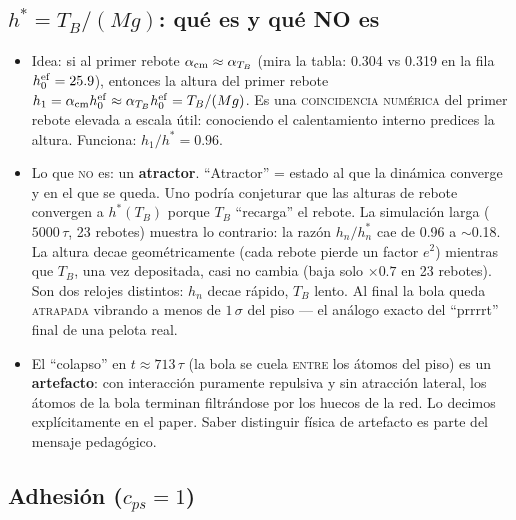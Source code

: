 \documentclass[11pt,a4paper]{article}
\begin{document}
\subsection{\texorpdfstring{$h^*=T_B/(Mg)$}{h*=TB/(Mg)}: qué es y qué NO es}

\begin{itemize}[leftmargin=1.4em]
    \item Idea: si al primer rebote $\alpha_{\rm cm}\approx\alpha_{T_B}$
    (mira la tabla: 0.304 vs 0.319 en la fila $h_0^{\rm ef}=25.9$),
    entonces la altura del primer rebote
    $h_1=\alpha_{\rm cm}h_0^{\rm ef}\approx\alpha_{T_B}h_0^{\rm ef}
    =T_B/(Mg)$. Es una \textsc{coincidencia numérica} del primer rebote
    elevada a escala útil: conociendo el calentamiento interno predices
    la altura. Funciona: $h_1/h^*=0.96$.
    \item Lo que \textsc{no} es: un \textbf{atractor}. ``Atractor'' =
    estado al que la dinámica converge y en el que se queda. Uno podría
    conjeturar que las alturas de rebote convergen a $h^*(T_B)$ porque
    $T_B$ ``recarga'' el rebote. La simulación larga ($5000\,\tau$, 23
    rebotes) muestra lo contrario: la razón $h_n/h_n^*$ cae de 0.96 a
    $\sim$0.18. La altura decae geométricamente (cada rebote pierde un
    factor $e^2$) mientras que $T_B$, una vez depositada, casi no cambia
    (baja solo $\times0.7$ en 23 rebotes). Son dos relojes distintos:
    $h_n$ decae rápido, $T_B$ lento. Al final la bola queda
    \textsc{atrapada} vibrando a menos de $1\,\sigma$ del piso --- el
    análogo exacto del ``prrrrt'' final de una pelota real.
    \item El ``colapso'' en $t\approx713\,\tau$ (la bola se cuela
    \textsc{entre} los átomos del piso) es un \textbf{artefacto}: con
    interacción puramente repulsiva y sin atracción lateral, los átomos
    de la bola terminan filtrándose por los huecos de la red. Lo decimos
    explícitamente en el paper. Saber distinguir física de artefacto es
    parte del mensaje pedagógico.
\end{itemize}

\subsection{Adhesión (\texorpdfstring{$c_{ps}=1$}{cps=1})}
\end{document}
